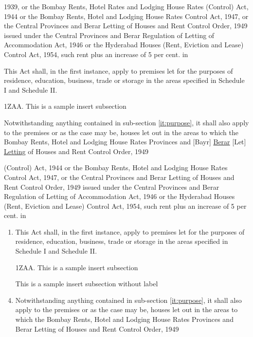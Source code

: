 \documentclass[11pt]{report}
\newcommand{\instxt}[1]{\underline{#1}}
\newcommand{\deltxt}[1]{[#1]}
\newcommand{\substxt}[2]{\deltxt{#1} \instxt{#2}}
\begin{document}
1939, or the Bombay Rents, Hotel Rates and Lodging House Rates
(Control) Act, 1944 or the Bombay Rents, Hotel and Lodging House Rates
Control Act, 1947, or the Central Provinces and Berar Letting of
Houses and Rent Control Order, 1949 issued under the Central Provinces
and Berar Regulation of Letting of Accommodation Act, 1946 or the
Hyderabad Houses (Rent, Eviction and Lease) Control Act, 1954, such
rent plus an increase of 5 per cent. in
\begin{list}{.}{%
    \settowidth{}
    \leftmargin{}
    \advance\leftmargin{}
    \advance\leftmargin{} 
    \advance\leftmargin{} 
  }
\item This Act shall, in the first instance, apply to premises let for
  the purposes of residence, education, business, trade or storage in
  the areas specified in Schedule I and Schedule II.
  \label{it:purpose}
\item[1ZAA.] This is a sample insert subsection
\item Notwithstanding anything contained in sub-section
  \ref{it:purpose}, it shall
  also apply to the premises or as the case may be, houses let out in
  the areas to which the Bombay Rents, Hotel and Lodging House Rates
  Provinces and \deltxt{Bayr} \instxt{Berar} \substxt{Let}{Letting} of Houses and Rent Control Order, 1949
\end{list}


(Control) Act, 1944 or the Bombay Rents, Hotel and Lodging House Rates
Control Act, 1947, or the Central Provinces and Berar Letting of
Houses and Rent Control Order, 1949 issued under the Central Provinces
and Berar Regulation of Letting of Accommodation Act, 1946 or the
Hyderabad Houses (Rent, Eviction and Lease) Control Act, 1954, such
rent plus an increase of 5 per cent. in
\begin{enumerate}
\item This Act shall, in the first instance, apply to premises let for
  the purposes of residence, education, business, trade or storage in
  the areas specified in Schedule I and Schedule II.
  \label{it:purpose}
\item[1ZAA.] This is a sample insert subsection

\item[] This is a sample insert subsection without label
\item Notwithstanding anything contained in sub-section
  \ref{it:purpose}, it shall
  also apply to the premises or as the case may be, houses let out in
  the areas to which the Bombay Rents, Hotel and Lodging House Rates
  Provinces and Berar Letting of Houses and Rent Control Order, 1949

\end{enumerate}
\end{document}
